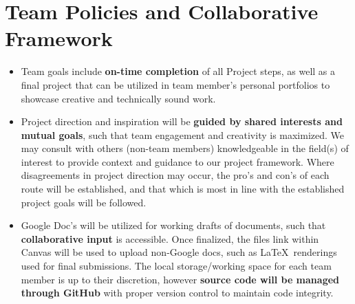 \documentclass{article}
\begin{document}
\section{Team Policies and Collaborative Framework}
\begin{tcolorbox}[colback=secondarycolor, colframe=primarycolor, arc=5mm]
\begin{itemize}
  \item Team goals include \textbf{on-time completion} of all Project steps, as well as a final project that can be utilized in team member’s personal portfolios to showcase creative and technically sound work.

  \vspace{0.2cm}

  \item Project direction and inspiration will be \textbf{guided by shared interests and mutual goals}, such that team engagement and creativity is maximized. We may consult with others (non-team members) knowledgeable in the field(s) of interest to provide context and guidance to our project framework. Where disagreements in project direction may occur, the pro’s and con’s of each route will be established, and that which is most in line with the established project goals will be followed.
   
  \vspace{0.2cm}
    
  \item Google Doc's will be utilized for working drafts of documents, such that \textbf{collaborative input} is accessible. Once finalized, the files link within Canvas will be used to upload non-Google docs, such as \LaTeX\ renderings used for final submissions. The local storage/working space for each team member is up to their discretion, however \textbf{source code will be managed through GitHub} with proper version control to maintain code integrity. 
  
\end{itemize}
\end{tcolorbox}

\vspace{0.5cm}
\end{document}
